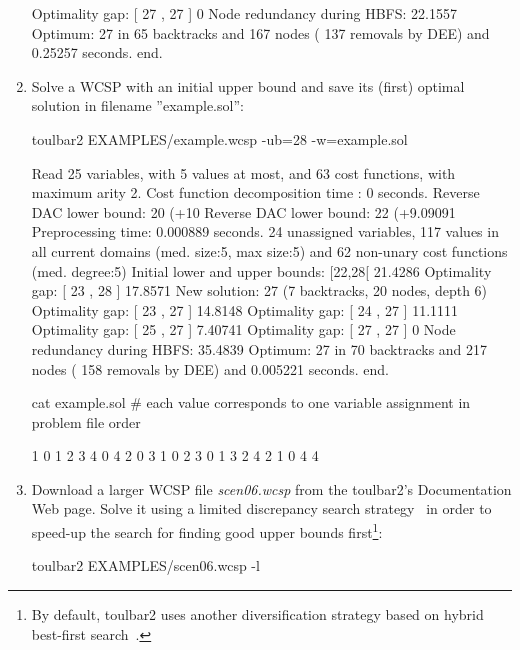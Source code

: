 \begin{enumerate}
{\begin{DoxyCode}
Optimality gap: [ 27 , 27 ] 0 %
Node redundancy during HBFS: 22.1557 %
Optimum: 27 in 65 backtracks and 167 nodes ( 137 removals by DEE) and 0.25257 seconds.
end.
\end{DoxyCode}}
\item Solve a WCSP with an initial upper bound and save its (first) optimal solution
in filename ''example.sol'':
\begin{DoxyCode}
	toulbar2 EXAMPLES/example.wcsp -ub=28 -w=example.sol
\end{DoxyCode}
{\scriptsize
\begin{DoxyCode}
Read 25 variables, with 5 values at most, and 63 cost functions, with maximum arity 2.
Cost function decomposition time : 0 seconds.
Reverse DAC lower bound: 20 (+10%
Reverse DAC lower bound: 22 (+9.09091%
Preprocessing time: 0.000889 seconds.
24 unassigned variables, 117 values in all current domains (med. size:5, max size:5) and 62 non-unary cost functions (med. degree:5)
Initial lower and upper bounds: [22,28[ 21.4286%
Optimality gap: [ 23 , 28 ] 17.8571 %
New solution: 27 (7 backtracks, 20 nodes, depth 6)
Optimality gap: [ 23 , 27 ] 14.8148 %
Optimality gap: [ 24 , 27 ] 11.1111 %
Optimality gap: [ 25 , 27 ] 7.40741 %
Optimality gap: [ 27 , 27 ] 0 %
Node redundancy during HBFS: 35.4839 %
Optimum: 27 in 70 backtracks and 217 nodes ( 158 removals by DEE) and 0.005221 seconds.
end.
\end{DoxyCode}}
\begin{DoxyCode}
cat example.sol
# each value corresponds to one variable assignment in problem file order
\end{DoxyCode}
{\scriptsize
\begin{DoxyCode}
 1 0 1 2 3 4 0 4 2 0 3 1 0 2 3 0 1 3 2 4 2 1 0 4 4
\end{DoxyCode}}
\item Download a larger WCSP file {\em scen06.wcsp} from the toulbar2's Documentation Web page. Solve it using a limited discrepancy search strategy~\cite{Ginsberg95} in order to speed-up the search for finding good upper bounds first\footnote{By default, toulbar2 uses another diversification strategy based on hybrid best-first search~\cite{Katsirelos15a}.}:
\begin{DoxyCode}
	toulbar2 EXAMPLES/scen06.wcsp -l
\end{DoxyCode}
{\scriptsize
\begin{DoxyCode}

\end{DoxyCode}}
\end{enumerate}
